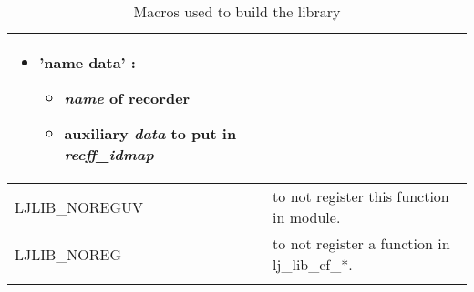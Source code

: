 \begin{center}
\begin{longtable}[H]{|p{4cm}|p{9cm}|}
\begin{itemize}
  \item 'name data' :
    \begin{itemize}
      \item \emph{name} of recorder
      \item auxiliary \emph{data} to put in \emph{recff\_idmap}
    \end{itemize}
  \end{itemize}                                                                             \\\hline
LJLIB\_NOREGUV                       & to not register this function in module.             \\\hline
LJLIB\_NOREG                         & to not register a function in lj\_lib\_cf\_*.        \\\hline
\caption{ Macros used to build the library}
\label{tab:library-macro}
\end{longtable}
\end{center}


